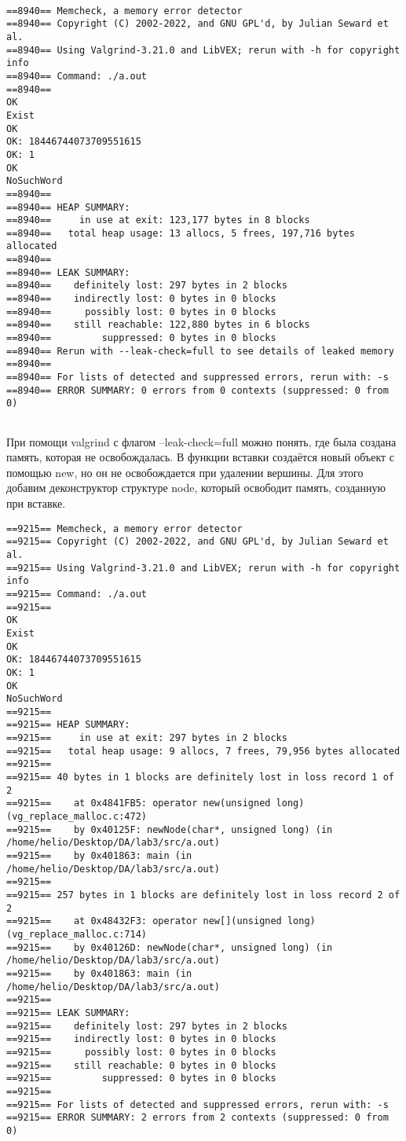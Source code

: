 \documentclass[12pt]{article}
\begin{document}
\begin{verbatim}

==8940== Memcheck, a memory error detector
==8940== Copyright (C) 2002-2022, and GNU GPL'd, by Julian Seward et al.
==8940== Using Valgrind-3.21.0 and LibVEX; rerun with -h for copyright info
==8940== Command: ./a.out
==8940== 
OK
Exist
OK
OK: 18446744073709551615
OK: 1
OK
NoSuchWord
==8940== 
==8940== HEAP SUMMARY:
==8940==     in use at exit: 123,177 bytes in 8 blocks
==8940==   total heap usage: 13 allocs, 5 frees, 197,716 bytes allocated
==8940== 
==8940== LEAK SUMMARY:
==8940==    definitely lost: 297 bytes in 2 blocks
==8940==    indirectly lost: 0 bytes in 0 blocks
==8940==      possibly lost: 0 bytes in 0 blocks
==8940==    still reachable: 122,880 bytes in 6 blocks
==8940==         suppressed: 0 bytes in 0 blocks
==8940== Rerun with --leak-check=full to see details of leaked memory
==8940== 
==8940== For lists of detected and suppressed errors, rerun with: -s
==8940== ERROR SUMMARY: 0 errors from 0 contexts (suppressed: 0 from 0)


\end{verbatim}

При помощи valgrind с флагом –leak-check=full можно понять, где
была создана память, которая не освобождалась. В функции вставки создаётся новый
объект с помощью new, но он не освобождается при удалении вершины.
Для этого добавим деконструктор структуре node, который освободит память, созданную
при вставке.



\begin{verbatim}
==9215== Memcheck, a memory error detector
==9215== Copyright (C) 2002-2022, and GNU GPL'd, by Julian Seward et al.
==9215== Using Valgrind-3.21.0 and LibVEX; rerun with -h for copyright info
==9215== Command: ./a.out
==9215== 
OK
Exist
OK
OK: 18446744073709551615
OK: 1
OK
NoSuchWord
==9215== 
==9215== HEAP SUMMARY:
==9215==     in use at exit: 297 bytes in 2 blocks
==9215==   total heap usage: 9 allocs, 7 frees, 79,956 bytes allocated
==9215== 
==9215== 40 bytes in 1 blocks are definitely lost in loss record 1 of 2
==9215==    at 0x4841FB5: operator new(unsigned long) (vg_replace_malloc.c:472)
==9215==    by 0x40125F: newNode(char*, unsigned long) (in /home/helio/Desktop/DA/lab3/src/a.out)
==9215==    by 0x401863: main (in /home/helio/Desktop/DA/lab3/src/a.out)
==9215== 
==9215== 257 bytes in 1 blocks are definitely lost in loss record 2 of 2
==9215==    at 0x48432F3: operator new[](unsigned long) (vg_replace_malloc.c:714)
==9215==    by 0x40126D: newNode(char*, unsigned long) (in /home/helio/Desktop/DA/lab3/src/a.out)
==9215==    by 0x401863: main (in /home/helio/Desktop/DA/lab3/src/a.out)
==9215== 
==9215== LEAK SUMMARY:
==9215==    definitely lost: 297 bytes in 2 blocks
==9215==    indirectly lost: 0 bytes in 0 blocks
==9215==      possibly lost: 0 bytes in 0 blocks
==9215==    still reachable: 0 bytes in 0 blocks
==9215==         suppressed: 0 bytes in 0 blocks
==9215== 
==9215== For lists of detected and suppressed errors, rerun with: -s
==9215== ERROR SUMMARY: 2 errors from 2 contexts (suppressed: 0 from 0)

\end{verbatim}
\end{document}
